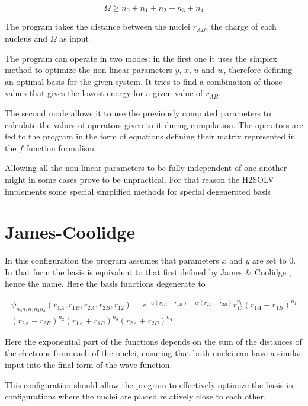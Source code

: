\documentclass{pracalicmgr}
\begin{document}
\begin{equation}
    \Omega \geq n_0+n_1+n_2+n_3+n_4
    \label{omegaDef}
\end{equation}

The program takes the distance between the nuclei $r_{AB}$, the charge of each nucleus and $\Omega$ as input

The program can operate in two modes: in the first one it uses the simplex method to optimize the non-linear parameters $y$, $x$, $u$ and $w$, therefore defining an optimal basis for the given system. It tries to find a combination of those values that gives the lowest energy for a given value of $r_{AB}$.

The second mode allows it to use the previously computed parameters to calculate the values of operators given to it during compilation. The operators are fed to the program in the form of equations defining their matrix represented in the $f$ function formalism.

Allowing all the non-linear parameters to be fully independent of one another might in some cases prove to be unpractical. For that reason the H2SOLV implements some special simplified methods for special degenerated basis

\section{James-Coolidge}

In this configuration the program assumes that parameters $x$ and $y$ are set to $0$. In that form the basis is equivalent to that first defined by James \& Coolidge \cite{JamesCoolidge}, hence the name. Here the basis functions degenerate to 

\begin{multline}
    \psi_{n_0 n_1 n_2 n_3 n_4} \left( r_{1A}, r_{1B}, r_{2A}, r_{2B}, r_{12} \right) = e^{-u\left(r_{1A}+r_{1B}\right)-w\left(r_{2A}+r_{2B}\right)}r_{12}^{n_0}{\left(r_{1A}-r_{1B}\right)}^{n_1}\\
    {\left(r_{2A}-r_{2B}\right)}^{n_2}{\left(r_{1A}+r_{1B}\right)}^{n_3}{\left(r_{2A}+r_{2B}\right)}^{n_4}
    \label{JC form}
\end{multline}

Here the exponential part of the functions depends on the sum of the distances of the electrons from each of the nuclei, ensuring that both nuclei can have a similar input into the final form of the wave function.

This configuration should allow the program to effectively optimize the basis in configurations where the nuclei are placed relatively close to each other.
\end{document}
